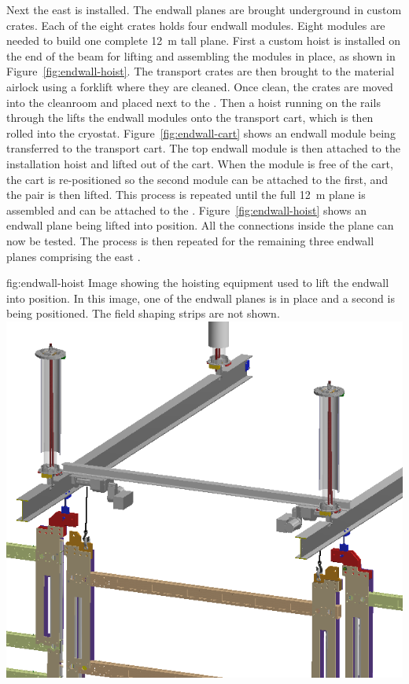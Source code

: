 Next the east  is installed. The endwall planes are brought underground in custom crates. Each of the eight crates holds four endwall modules.  Eight modules are needed to build one complete \SI{12}{m} tall plane.  First a custom hoist is installed on the end of the  beam for lifting and assembling the modules in place, as shown in Figure~\ref{fig:endwall-hoist}. The  transport crates are then brought to the material airlock using a forklift where they are cleaned.  Once clean, the crates are moved into the cleanroom and placed next to the . Then a hoist running on the rails through the  lifts the endwall modules onto the transport cart, which is then rolled into the cryostat. Figure~\ref{fig:endwall-cart} shows an endwall module being transferred to the transport cart. The top endwall module is then attached to the installation hoist and lifted out of the cart. When the module is free of  the cart, the cart is re-positioned so the second module can be attached to the first, and the pair is then lifted. This process is repeated until the full \SI{12}{m}  plane is assembled and can be attached to the . 
Figure~\ref{fig:endwall-hoist} shows an endwall plane being lifted into position.
All the  connections inside the plane can now be tested. The process is then repeated for the remaining three endwall planes comprising the east  . 
 
 \begin{dunefigure}{fig:endwall-hoist}
  {Image showing the hoisting equipment used to lift the endwall into position. In this image, one of the endwall planes is in place and a second is being positioned. The field shaping strips are not shown.}
\includegraphics[width=.5\textwidth]{graphics/endwall-hoist.png}
\end{dunefigure}
 
